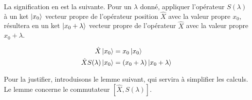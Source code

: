 \documentclass[../notesdecours]{subfiles}
\begin{document}
La signification en est la suivante. Pour un $\lambda$ donné, appliquer l'opérateur $S(\lambda)$ à un ket $\ket{x_0}$ vecteur propre de l'opérateur position $\hat X$ avec la valeur propre $x_0$, résultera en un ket $\ket{x_0+\lambda}$ vecteur propre de l'opérateur $\hat X$ avec la valeur propre $x_0+\lambda$.

\begin{align}
\hat X \ket{x_0}&= x_0 \ket{x_0} \notag \\
	\hat X S(\lambda)\ket{x_0} &= (x_0+\lambda) \ket{x_0+\lambda} \label{eq:chap6-operateur_translation_signification}
\end{align}

Pour la justifier, introduisons le lemme suivant, qui servira à simplifier les calculs. Le lemme concerne le commutateur $[\hat X, S(\lambda)]$.
\end{document}
